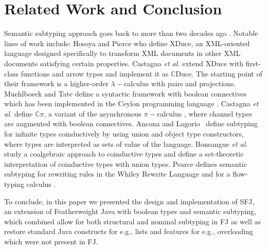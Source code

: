 \documentclass[runningheads]{llncs}
\begin{document}
\section{Related Work and Conclusion}
\label{sec:conclusion}
Semantic subtyping approach goes back to more than two decades ago \cite{Aiken,Damm}.
Notable lines of work include:
Hosoya and Pierce \cite{XML1,XML2,XML3} who define XDuce, an XML-oriented language designed specifically to transform XML documents in other XML documents satisfying certain properties.
Castagna \emph{et al.} \cite{gentle,Cas05,FCB08} extend XDuce with first-class functions and arrow types and implement it as $\mathbb{C}$Duce. The starting point of their framework is a higher-order $\lambda-$calculus with pairs and projections.
Muehlboeck and Tate \cite{Muehlboeck2018} define a syntactic framework with boolean connectives which has been implemented in the Ceylon programming language \cite{Ceylon2016}.
Castagna \emph{et al.} \cite{Cpi} define $\mathbb{C}\pi$, a variant of the asynchronous $\pi-$calculus \cite{sangiorgi}, where channel types are augmented with boolean connectives.
Ancona and Lagorio~\cite{AL10} define subtyping for infinite types coinductively by using union and object type constructors, where types are interpreted as sets of value of the language.
Bonsangue \emph{et al.}~\cite{BRABR14} study a coalgebraic approach to coinductive types and define a set-theoretic interpretation of coinductive types with union types.
Pearce \cite{Pearce19} defines semantic subtyping for rewriting rules in the Whiley Rewrite Language and for a flow-typing calculus  \cite{Pearce13}.

To conclude, in this paper we presented the design and implementation of SFJ, an extension of Featherweight Java with boolean types and semantic subtyping, which combined allow for both structural and nominal subtyping in FJ as well as restore standard Java constructs for e.g., lists and features for e.g., overloading which were not present in FJ.

\newpage


\end{document}
